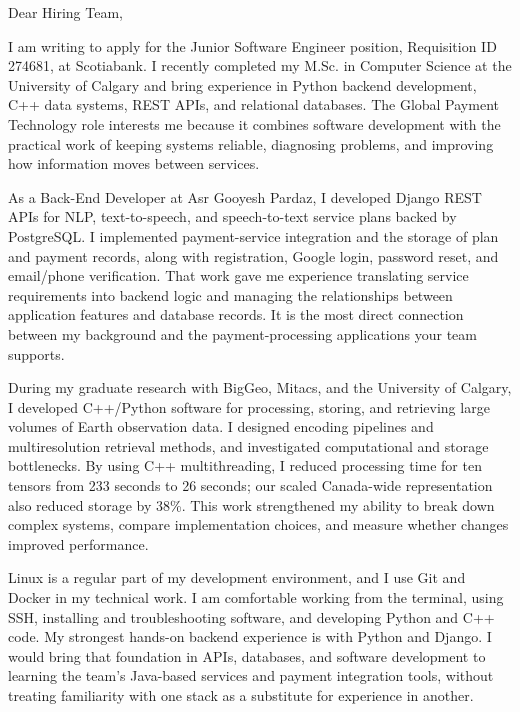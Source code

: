 \documentclass[11pt]{letter}
\begin{document}
\begin{letter}{}

\opening{Dear Hiring Team,}

I am writing to apply for the Junior Software Engineer position, Requisition ID 274681, at Scotiabank. I recently completed my M.Sc. in Computer Science at the University of Calgary and bring experience in Python backend development, C++ data systems, REST APIs, and relational databases. The Global Payment Technology role interests me because it combines software development with the practical work of keeping systems reliable, diagnosing problems, and improving how information moves between services.

As a Back-End Developer at Asr Gooyesh Pardaz, I developed Django REST APIs for NLP, text-to-speech, and speech-to-text service plans backed by PostgreSQL. I implemented payment-service integration and the storage of plan and payment records, along with registration, Google login, password reset, and email/phone verification. That work gave me experience translating service requirements into backend logic and managing the relationships between application features and database records. It is the most direct connection between my background and the payment-processing applications your team supports.

During my graduate research with BigGeo, Mitacs, and the University of Calgary, I developed C++/Python software for processing, storing, and retrieving large volumes of Earth observation data. I designed encoding pipelines and multiresolution retrieval methods, and investigated computational and storage bottlenecks. By using C++ multithreading, I reduced processing time for ten tensors from 233 seconds to 26 seconds; our scaled Canada-wide representation also reduced storage by 38\%. This work strengthened my ability to break down complex systems, compare implementation choices, and measure whether changes improved performance.

Linux is a regular part of my development environment, and I use Git and Docker in my technical work. I am comfortable working from the terminal, using SSH, installing and troubleshooting software, and developing Python and C++ code. My strongest hands-on backend experience is with Python and Django. I would bring that foundation in APIs, databases, and software development to learning the team's Java-based services and payment integration tools, without treating familiarity with one stack as a substitute for experience in another.


\end{letter}
\end{document}
